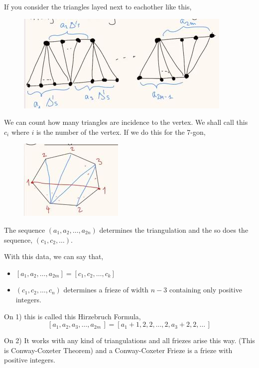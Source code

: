 \documentclass{article}
\begin{document}
If you consider the triangles layed next to eachother like this,
\begin{figure}[!ht]
  \centering
  \includegraphics{./figures/L1.2}
  \caption{}
\end{figure}
We can count how many triangles are incidence to the vertex. We shall call this $c_i$ where $i$ is the number of the vertex. If we do this for the 7-gon,
\begin{figure}[!ht]
  \centering
  \includegraphics{./figures/L1.3}
  \caption{}
\end{figure}
The sequence $(a_1, a_2, \dots, a_{2n})$ determines the triangulation and the so does the sequence, $(c_1, c_2, \dots)$.

\begin{nthm}
  With this data, we can say that,
  \begin{itemize}
    \item $[a_1, a_2, \dots, a_{2m}] = \![ c_1, c_2, \dots, c_k \!]$
    \item $(c_1, c_2, \dots, c_n)$ determines a frieze of width $n-3$ containing only positive integers.
  \end{itemize}
\end{nthm}

\begin{remark}
  On 1) this is called this Hirzebruch Formula,
  $$ [a_1, a_2, a_3, \dots, a_{2m}\,] = \![ a_1+1, 2, 2, \dots, 2, a_3+2, 2, \dots \,\!] $$
\end{remark}

\begin{remark}
  On 2) It works with any kind of triangulations and all friezes arise this way. (This is Conway-Coxeter Theorem) and a Conway-Coxeter Frieze is a frieze with positive integers.
\end{remark}
\end{document}

